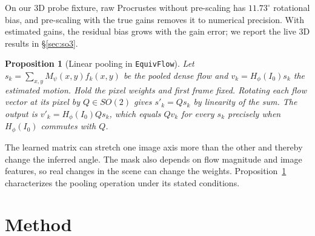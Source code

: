 \documentclass{article}
\theoremstyle{plain}
\newtheorem{proposition}{Proposition}
\theoremstyle{remark}
\begin{document}
On our 3D probe fixture, raw Procrustes without pre-scaling has $11.73^\circ$ rotational bias, and pre-scaling with the true gains removes it to numerical precision. With estimated gains, the residual bias grows with the gain error; we report the live 3D results in \S\ref{sec:so3}.

\begin{proposition}[Linear pooling in \texttt{EquivFlow}]
\label{prop:cardinal}
Let $s_k=\sum_{x,y}M_\psi(x,y)f_k(x,y)$ be the pooled dense flow and $v_k=H_\phi(I_0)s_k$ the estimated motion. Hold the pixel weights and first frame fixed. Rotating each flow vector at its pixel by $Q\in SO(2)$ gives $s'_k=Q s_k$ by linearity of the sum. The output is $v'_k=H_\phi(I_0)Q s_k$, which equals $Qv_k$ for every $s_k$ precisely when $H_\phi(I_0)$ commutes with $Q$.
\end{proposition}

The learned matrix can stretch one image axis more than the other and thereby change the inferred angle. The mask also depends on flow magnitude and image features, so real changes in the scene can change the weights. Proposition~\ref{prop:cardinal} characterizes the pooling operation under its stated conditions.

\section{Method}
\label{sec:method}
\end{document}
